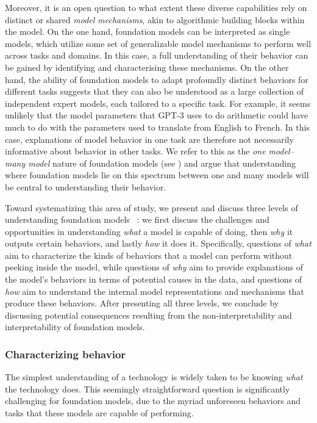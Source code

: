 Moreover, it is an open question to what extent these diverse capabilities rely on distinct or shared \textit{model mechanisms}, akin to algorithmic building blocks within the model. On the one hand, foundation models can be interpreted as single models, which utilize some set of generalizable model mechanisms to perform well across tasks and domains. In this case, a full understanding of their behavior can be gained by identifying and characterising these mechanisms. On the other hand, the ability of foundation models to adapt profoundly distinct behaviors for different tasks suggests that they can also be understood as a large collection of independent expert models, each tailored to a specific task. For example, it seems unlikely that the model parameters that GPT-3 uses to do arithmetic could have much to do with the parameters used to translate from English to French. In this case, explanations of model behavior in one task are therefore not necessarily informative about behavior in other tasks. We refer to this as the \emph{one model--many model} nature of foundation models (see ) and argue that understanding where foundation models lie on this spectrum between one and many models will be central to understanding their behavior.

Toward systematizing this area of study, we present and discuss three levels of understanding foundation models
~\citep[inspired by][]{marr1982vision}: we first discuss the challenges and opportunities in understanding \textit{what} a model is capable of doing, then \textit{why} it outputs certain behaviors, and lastly \textit{how} it does it. Specifically, questions of \emph{what} aim to characterize the kinds of behaviors that a model can perform without peeking inside the model, while questions of \emph{why} aim to provide explanations of the model's behaviors in terms of potential causes in the data, and questions of \emph{how} aim to understand the internal model representations and mechanisms that produce these behaviors. After presenting all three levels, we conclude by discussing potential consequences resulting from the non-interpretability and interpretability of foundation models.

\subsubsection{Characterizing behavior}
\label{sec:interpretability-behavior}

The simplest understanding of a technology is widely taken to be knowing \textit{what} the technology does. This seemingly straightforward question is significantly challenging for foundation models, due to the myriad unforeseen behaviors and tasks that these models are capable of performing. 

